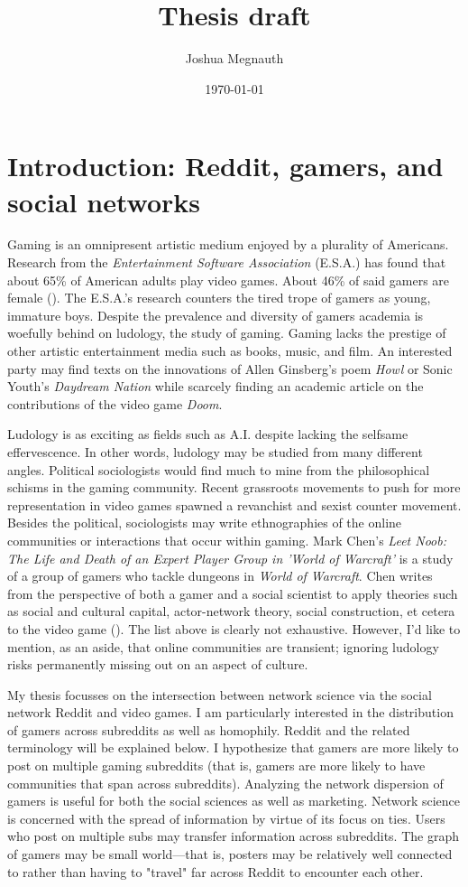 \documentclass[12pt, a4paper]{article}
\title{Thesis draft}
\author{Joshua Megnauth}
\date{\today}
\begin{document}
\maketitle

\section{Introduction: Reddit, gamers, and social networks}
Gaming is an omnipresent artistic medium enjoyed by a plurality of Americans. Research from the \textit{Entertainment Software Association} (E.S.A.) has found that about 65\% of American adults play video games. About 46\% of said gamers are female (\cite{esagamers}). The E.S.A.'s research counters the tired trope of gamers as young, immature boys. Despite the prevalence and diversity of gamers academia is woefully behind on ludology, the study of gaming. Gaming lacks the prestige of other artistic entertainment media such as books, music, and film. An interested party may find texts on the innovations of Allen Ginsberg's poem \textit{Howl} or Sonic Youth's \textit{Daydream Nation} while scarcely finding an academic article on the contributions of the video game \textit{Doom}.

Ludology is as exciting as fields such as A.I. despite lacking the selfsame effervescence. In other words, ludology may be studied from many different angles. Political sociologists would find much to mine from the philosophical schisms in the gaming community. Recent grassroots movements to push for more representation in video games spawned a revanchist and sexist counter movement. Besides the political, sociologists may write ethnographies of the online communities or interactions that occur within gaming. Mark Chen's \textit{Leet Noob: The Life and Death of an Expert Player Group in 'World of Warcraft'} is a study of a group of gamers who tackle dungeons in \textit{World of Warcraft}. Chen writes from the perspective of both a gamer and a social scientist to apply theories such as social and cultural capital, actor-network theory, social construction, et cetera to the video game (\cite{chenwow}). The list above is clearly not exhaustive. However, I'd like to mention, as an aside, that online communities are transient; ignoring ludology risks permanently missing out on an aspect of culture.

My thesis focusses on the intersection between network science via the social network Reddit and video games. I am particularly interested in the distribution of gamers across subreddits as well as homophily. Reddit and the related terminology will be explained below. I hypothesize that gamers are more likely to post on multiple gaming subreddits (that is, gamers are more likely to have communities that span across subreddits). Analyzing the network dispersion of gamers is useful for both the social sciences as well as marketing. Network science is concerned with the spread of information by virtue of its focus on ties. Users who post on multiple subs may transfer information across subreddits. The graph of gamers may be small world---that is, posters may be relatively well connected to rather than having to "travel" far across Reddit to encounter each other.
\end{document}
